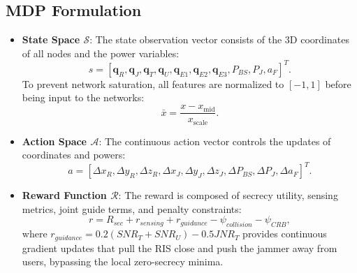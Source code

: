 \documentclass[journal,onecolumn]{IEEEtran}
\begin{document}
\subsection{MDP Formulation}
\begin{itemize}
    \item \textbf{State Space $\mathcal{S}$}: The state observation vector consists of the 3D coordinates of all nodes and the power variables:
    \begin{equation}
        s = [\mathbf{q}_R, \mathbf{q}_J, \mathbf{q}_T, \mathbf{q}_U, \mathbf{q}_{E1}, \mathbf{q}_{E2}, \mathbf{q}_{E3}, P_{BS}, P_J, a_F]^T.
    \end{equation}
    To prevent network saturation, all features are normalized to $[-1, 1]$ before being input to the networks:
    \begin{equation}
        \bar{x} = \frac{x - x_{\text{mid}}}{x_{\text{scale}}}.
    \end{equation}
    \item \textbf{Action Space $\mathcal{A}$}: The continuous action vector controls the updates of coordinates and powers:
    \begin{equation}
        a = [\Delta x_R, \Delta y_R, \Delta z_R, \Delta x_J, \Delta y_J, \Delta z_J, \Delta P_{BS}, \Delta P_J, \Delta a_F]^T.
    \end{equation}
    \item \textbf{Reward Function $\mathcal{R}$}: The reward is composed of secrecy utility, sensing metrics, joint guide terms, and penalty constraints:
    \begin{equation}
        r = R_{sec} + r_{sensing} + r_{guidance} - \psi_{collision} - \psi_{CRB},
    \end{equation}
    where $r_{guidance} = 0.2(SNR_T + SNR_U) - 0.5 JNR_T$ provides continuous gradient updates that pull the RIS close and push the jammer away from users, bypassing the local zero-secrecy minima.
\end{itemize}
\end{document}
